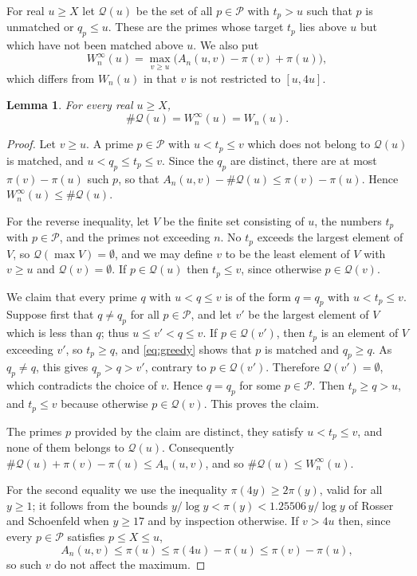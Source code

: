 \documentclass[11pt,reqno]{amsart}
\newtheorem{lemma}[theorem]{Lemma}
\theoremstyle{definition}
\theoremstyle{remark}
\numberwithin{equation}{section}
\newcommand{\cP}{\mathcal{P}}
\newcommand{\cQ}{\mathcal{Q}}
\begin{document}
For real $u\ge X$ let $\cQ(u)$ be the set of all $p\in\cP$ with $t_p>u$ such that $p$ is unmatched or $q_p\le u$. These are the primes whose target $t_p$ lies above $u$ but which have not been matched above $u$. We also put
\[
 W_n^\infty(u)=\max_{v\ge u}\bigl(A_n(u,v)-\pi(v)+\pi(u)\bigr),
\]
which differs from $W_n(u)$ in that $v$ is not restricted to $[u,4u]$.

\begin{lemma}\label{lem:queue}
For every real $u\ge X$,
\[
 \#\cQ(u)=W_n^\infty(u)=W_n(u).
\]
\end{lemma}

\begin{proof}
Let $v\ge u$. A prime $p\in\cP$ with $u<t_p\le v$ which does not belong to $\cQ(u)$ is matched, and $u<q_p\le t_p\le v$. Since the $q_p$ are distinct, there are at most $\pi(v)-\pi(u)$ such $p$, so that $A_n(u,v)-\#\cQ(u)\le\pi(v)-\pi(u)$. Hence $W_n^\infty(u)\le\#\cQ(u)$.

For the reverse inequality, let $V$ be the finite set consisting of $u$, the numbers $t_p$ with $p\in\cP$, and the primes not exceeding $n$. No $t_p$ exceeds the largest element of $V$, so $\cQ(\max V)=\emptyset$, and we may define $v$ to be the least element of $V$ with $v\ge u$ and $\cQ(v)=\emptyset$. If $p\in\cQ(u)$ then $t_p\le v$, since otherwise $p\in\cQ(v)$.

We claim that every prime $q$ with $u<q\le v$ is of the form $q=q_p$ with $u<t_p\le v$. Suppose first that $q\ne q_p$ for all $p\in\cP$, and let $v'$ be the largest element of $V$ which is less than $q$; thus $u\le v'<q\le v$. If $p\in\cQ(v')$, then $t_p$ is an element of $V$ exceeding $v'$, so $t_p\ge q$, and \eqref{eq:greedy} shows that $p$ is matched and $q_p\ge q$. As $q_p\ne q$, this gives $q_p>q>v'$, contrary to $p\in\cQ(v')$. Therefore $\cQ(v')=\emptyset$, which contradicts the choice of $v$. Hence $q=q_p$ for some $p\in\cP$. Then $t_p\ge q>u$, and $t_p\le v$ because otherwise $p\in\cQ(v)$. This proves the claim.

The primes $p$ provided by the claim are distinct, they satisfy $u<t_p\le v$, and none of them belongs to $\cQ(u)$. Consequently $\#\cQ(u)+\pi(v)-\pi(u)\le A_n(u,v)$, and so $\#\cQ(u)\le W_n^\infty(u)$.

For the second equality we use the inequality $\pi(4y)\ge2\pi(y)$, valid for all $y\ge1$; it follows from the bounds $y/\log y<\pi(y)<1.25506\,y/\log y$ of Rosser and Schoenfeld \cite[Corollary~1]{RS} when $y\ge17$ and by inspection otherwise. If $v>4u$ then, since every $p\in\cP$ satisfies $p\le X\le u$,
\[
 A_n(u,v)\le\pi(u)\le\pi(4u)-\pi(u)\le\pi(v)-\pi(u),
\]
so such $v$ do not affect the maximum.
\end{proof}
\end{document}
